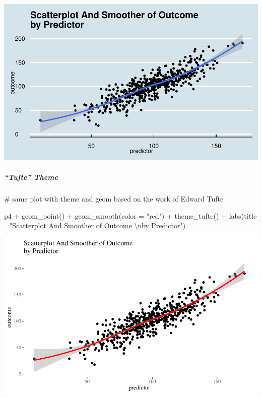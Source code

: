 \documentclass[12pt,]{article}
\newenvironment{Shaded}{}{}
\newcommand{\CharTok}[1]{\textcolor[rgb]{0.00,0.50,0.50}{#1}}
\newcommand{\CommentTok}[1]{\textcolor[rgb]{0.00,0.50,0.00}{#1}}
\newcommand{\DataTypeTok}[1]{#1}
\newcommand{\KeywordTok}[1]{\textcolor[rgb]{0.00,0.00,1.00}{#1}}
\newcommand{\NormalTok}[1]{#1}
\newcommand{\OperatorTok}[1]{#1}
\newcommand{\StringTok}[1]{\textcolor[rgb]{0.00,0.50,0.50}{#1}}
\let\oldsubparagraph\subparagraph
\renewcommand{\subparagraph}[1]{\oldsubparagraph{#1}\mbox{}}
\begin{document}
\includegraphics{introduction-to-ggplot2_files/figure-latex/unnamed-chunk-29-1.pdf}

\hypertarget{tufte-theme}{%
\subparagraph{``Tufte'' Theme}\label{tufte-theme}}

\begin{Shaded}
\begin{Highlighting}[]
\CommentTok{# same plot with theme and geom based on the work of Edward Tufte}

\NormalTok{p4 }\OperatorTok{+}\StringTok{ }
\StringTok{  }\KeywordTok{geom_point}\NormalTok{() }\OperatorTok{+}\StringTok{ }
\StringTok{  }\KeywordTok{geom_smooth}\NormalTok{(}\DataTypeTok{color =} \StringTok{"red"}\NormalTok{) }\OperatorTok{+}\StringTok{ }
\StringTok{  }\KeywordTok{theme_tufte}\NormalTok{() }\OperatorTok{+}
\StringTok{  }\KeywordTok{labs}\NormalTok{(}\DataTypeTok{title =}\StringTok{"Scatterplot And Smoother of Outcome }\CharTok{\textbackslash{}n}\StringTok{by Predictor"}\NormalTok{)}
\end{Highlighting}
\end{Shaded}

\includegraphics{introduction-to-ggplot2_files/figure-latex/unnamed-chunk-30-1.pdf}
\end{document}
